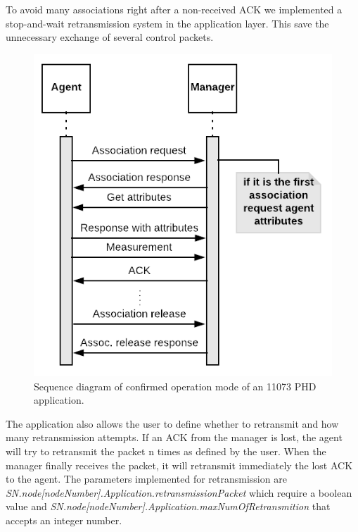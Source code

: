 To avoid many associations right after a non-received ACK we implemented a stop-and-wait retransmission system in the application layer. This save the unnecessary exchange of several control packets.

\begin{figure}[htbp]
\centerline{\includegraphics[scale=0.35]{figures/confirmed.png}}
\caption{Sequence diagram of confirmed operation mode of an 11073 PHD application.}
\label{fig:confirmedMode}
\end{figure}

The application also allows the user to define whether to retransmit and how many retransmission attempts. If an ACK from the manager is lost, the agent will try to retransmit the packet n times as defined by the user. When the manager finally receives the packet, it will retransmit immediately the lost ACK to the agent. The parameters implemented for retransmission are \textit{SN.node[nodeNumber].Application.retransmissionPacket} which require a boolean value and \textit{SN.node[nodeNumber].Application.maxNumOfRetransmition} that accepts an integer number. 